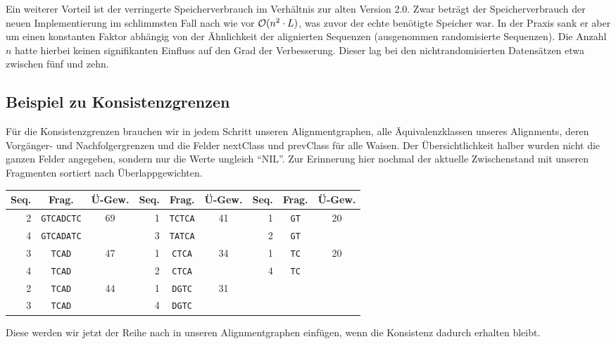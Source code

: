 Ein weiterer Vorteil ist der verringerte Speicherverbrauch im Verhältnis zur alten Version 2.0. Zwar beträgt der Speicherverbrauch der neuen Implementierung im schlimmsten Fall nach wie vor $\mathcal{O}(n^2\cdot L)$, was zuvor der echte benötigte Speicher war. In der Praxis sank er aber um einen konstanten Faktor abhängig von der Ähnlichkeit der alignierten Sequenzen (ausgenommen randomisierte Sequenzen). Die Anzahl $n$ hatte hierbei keinen signifikanten Einfluss auf den Grad der Verbesserung. Dieser lag bei den nichtrandomisierten Datensätzen etwa zwischen fünf und zehn.

\subsection{Beispiel zu Konsistenzgrenzen}

Für die Konsistenzgrenzen brauchen wir in jedem Schritt unseren Alignmentgraphen, alle Äquivalenzklassen unseres Alignments, deren Vorgänger- und Nachfolgergrenzen und die Felder \textrm{nextClass} und \textrm{prevClass} für alle  Waisen. Der Übersichtlichkeit halber wurden nicht die ganzen Felder angegeben, sondern nur die Werte ungleich \enquote{NIL}. Zur Erinnerung hier nochmal der aktuelle Zwischenstand mit unseren Fragmenten sortiert nach Überlappgewichten.

\begin{tabular}{|r|c|c||r|c|c||r|c|c|}
	\hline
	Seq. & Frag. & Ü-Gew. & Seq. & Frag. & Ü-Gew. & Seq. & Frag. & Ü-Gew.\\
	\hline
	2 & \texttt{GTCADCTC} & \multirow{2}{*}{69} & 1 & \texttt{TCTCA} & \multirow{2}{*}{41} & 1 & \texttt{GT} &\multirow{2}{*}{20} \\
	4 & \texttt{GTCADATC} &                     & 3 & \texttt{TATCA} &                     & 2 & \texttt{GT} & \\
	3 & \texttt{TCAD} & \multirow{2}{*}{47} & 1 & \texttt{CTCA} & \multirow{2}{*}{34} & 1 & \texttt{TC} & \multirow{2}{*}{20} \\
	4 & \texttt{TCAD} &                     & 2 & \texttt{CTCA} &                          & 4 & \texttt{TC} & \\
	2 & \texttt{TCAD} & \multirow{2}{*}{44} & 1 & \texttt{DGTC} & \multirow{2}{*}{31} &    &   & \\
	3 & \texttt{TCAD} &                     & 4 & \texttt{DGTC} &                     &    &   & \\
	\hline
\end{tabular}

Diese werden wir jetzt der Reihe nach in unseren Alignmentgraphen einfügen, wenn die Konsistenz dadurch erhalten bleibt.

